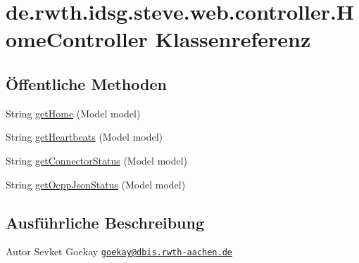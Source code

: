 \hypertarget{classde_1_1rwth_1_1idsg_1_1steve_1_1web_1_1controller_1_1_home_controller}{\section{de.\-rwth.\-idsg.\-steve.\-web.\-controller.\-Home\-Controller Klassenreferenz}
\label{classde_1_1rwth_1_1idsg_1_1steve_1_1web_1_1controller_1_1_home_controller}
}
\subsection*{Öffentliche Methoden}
\begin{DoxyCompactItemize}
\item 
String \hyperlink{classde_1_1rwth_1_1idsg_1_1steve_1_1web_1_1controller_1_1_home_controller_a92cd136a228e7c1e4fa034e8f704e483}{get\-Home} (Model model)
\item 
String \hyperlink{classde_1_1rwth_1_1idsg_1_1steve_1_1web_1_1controller_1_1_home_controller_a832fe2619fab8ec6f83384bbe9de5864}{get\-Heartbeats} (Model model)
\item 
String \hyperlink{classde_1_1rwth_1_1idsg_1_1steve_1_1web_1_1controller_1_1_home_controller_ae7418d16011978b9e3ea9cbd7b215964}{get\-Connector\-Status} (Model model)
\item 
String \hyperlink{classde_1_1rwth_1_1idsg_1_1steve_1_1web_1_1controller_1_1_home_controller_a444d3c418aa816ec12f7685e82200790}{get\-Ocpp\-Json\-Status} (Model model)
\end{DoxyCompactItemize}


\subsection{Ausführliche Beschreibung}
\begin{DoxyAuthor}{Autor}
Sevket Goekay \href{mailto:goekay@dbis.rwth-aachen.de}{\tt goekay@dbis.\-rwth-\/aachen.\-de} 
\end{DoxyAuthor}


